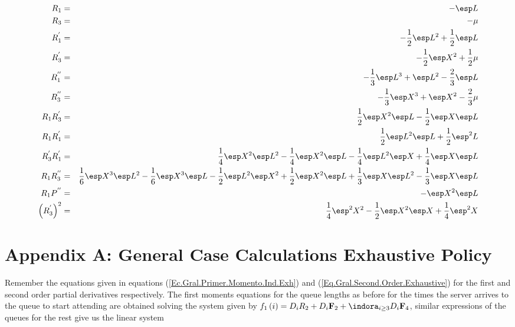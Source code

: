 \begin{eqnarray*}
R_{1}&=&-\esp L\\
R_{3}&=& -\mu\\
R_{1}^{'}&=&-\frac{1}{2}\esp L^{2}+\frac{1}{2}\esp L\\
R_{3}^{'}&=&-\frac{1}{2}\esp X^{2}+\frac{1}{2}\mu\\
R_{1}^{''}&=&-\frac{1}{3}\esp L^{3}+\esp L^{2}-\frac{2}{3}\esp L\\
R_{3}^{''}&=&-\frac{1}{3}\esp X^{3}+\esp X^{2}-\frac{2}{3}\mu\\
R_{1}R_{3}^{'}&=&\frac{1}{2}\esp X^{2}\esp L-\frac{1}{2}\esp X\esp L\\
R_{1}R_{1}^{'}&=&\frac{1}{2}\esp L^{2}\esp L+\frac{1}{2}\esp^{2}L\\
R_{3}^{'}R_{1}^{'}&=&\frac{1}{4}\esp X^{2}\esp L^{2}-\frac{1}{4}\esp X^{2}\esp L-\frac{1}{4}\esp L^{2}\esp X+\frac{1}{4}\esp X\esp L\\
R_{1}R_{3}^{''}&=&\frac{1}{6}\esp X^{3}\esp L^{2}-\frac{1}{6}\esp X^{3}\esp L-\frac{1}{2}\esp L^{2}\esp X^{2}+\frac{1}{2}\esp X^{2}\esp L+\frac{1}{3}\esp X\esp L^{2}-\frac{1}{3}\esp X\esp L\\
R_{1}P^{''}&=&-\esp X^{2}\esp L\\
\left(R_{3}^{'}\right)^{2}&=&\frac{1}{4}\esp^{2}X^{2}-\frac{1}{2}\esp X^{2}\esp X+\frac{1}{4}\esp^{2} X
\end{eqnarray*}









\newpage
\section{Appendix A: General Case Calculations Exhaustive Policy}\label{Secc.Append.B}



Remember the equations given in equations (\ref{Ec.Gral.Primer.Momento.Ind.Exh}) and (\ref{Eq.Gral.Second.Order.Exhaustive}) for the first and second order partial derivatives respectively. The first moments equations for the queue lengths as before for the times the server arrives to the queue to start attending are obtained solving the system given by $f_{1}\left(i\right)=D_{i}R_{2}+D_{i}\mathbf{F}_{2}+\indora_{i\geq3}D_{i}\mathbf{F}_{4}$, similar expressions of the queues for the rest give us the linear system



